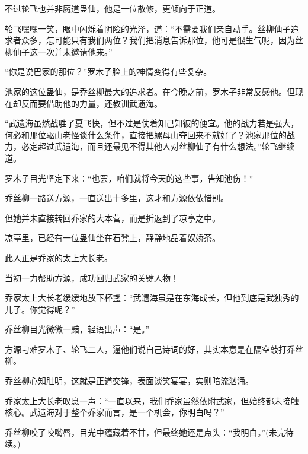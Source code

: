 \begin{this_body}
不过轮飞也并非魔道蛊仙，他是一位散修，更倾向于正道。

轮飞嘿嘿一笑，眼中闪烁着阴险的光泽，道：“不需要我们亲自动手。丝柳仙子追求者众多，怎可能只有我们两位？我们把消息告诉那位，他可是很生气呢，因为丝柳仙子这一次并未邀请他来。”

“你是说巴家的那位？”罗木子脸上的神情变得有些复杂。

池家的这位蛊仙，是乔丝柳最大的追求者。在今晚之前，罗木子非常反感他。但现在却反而要借助他的力量，还教训武遗海。

“武遗海虽然战胜了夏飞快，但不过是仗着知己知彼的便宜。他的战力若是强大，何必和那位驱山老怪谈什么条件，直接把螺母山夺回来不就好了？池家那位的战力，必定超过武遗海，而且还最见不得其他人对丝柳仙子有什么想法。”轮飞继续道。

罗木子目光坚定下来：“也罢，咱们就将今天的这些事，告知池伤！”

乔丝柳一路送方源，一直送出十多里，这才和方源依依惜别。

但她并未直接转回乔家的大本营，而是折返到了凉亭之中。

凉亭里，已经有一位蛊仙坐在石凳上，静静地品着奴娇茶。

此人正是乔家的太上大长老。

当初一力帮助方源，成功回归武家的关键人物！

乔家太上大长老缓缓地放下杯盏：“武遗海虽是在东海成长，但他到底是武独秀的儿子。你觉得呢？”

乔丝柳目光微微一黯，轻语出声：“是。”

方源刁难罗木子、轮飞二人，逼他们说自己诗词的好，其实本意是在隔空敲打乔丝柳。

乔丝柳心知肚明，这就是正道交锋，表面谈笑宴宴，实则暗流汹涌。

乔家太上大长老叹息一声：“一直以来，我们乔家虽然依附武家，但始终都未接触核心。武遗海对于整个乔家而言，是一个机会，你明白吗？”

乔丝柳咬了咬嘴唇，目光中蕴藏着不甘，但最终她还是点头：“我明白。”(未完待续。)

\end{this_body}

